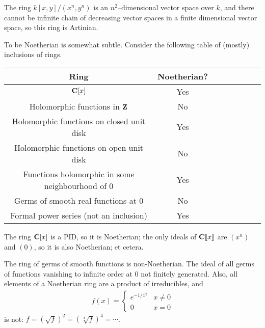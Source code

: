 \documentclass[11pt, oneside,margin=1in]{article}
\begin{document}
\begin{example}\label{}
The ring $k[x,y]/(x^n,y^n)$ is an $n^2$--dimensional vector space over $k$, and there cannot be infinite chain of decreasing vector spaces in a finite dimensional vector space, so this ring is Artinian.
\end{example}

To be Noetherian is somewhat subtle. Consider the following table of (mostly) inclusions of rings.
	\begin{center}
\begin{tabular}{cccccccc}
    	Ring & Noetherian?\\
	\midrule
	$\mathbf C[x]$ & Yes\\
	Holomorphic functions in $\mathbf Z$ & No\\
	Holomorphic functions on closed unit disk & Yes\\
	Holomorphic functions on open unit disk & No\\
	Functions holomorphic in some neighbourhood of $0$ & Yes\\
	Germs of smooth real functions at $0$ & No\\
	Formal power series (not an inclusion) & Yes
\end{tabular}
\end{center}

The ring $\mathbf C[x]$ is a PID, so it is Noetherian; the only ideals of $\mathbf C[\![x]\!]$ are $(x^n)$ and $(0)$, so it is also Noetherian; et cetera.
\iffalse The ring of holomorphic functions on $\C$ is not Noetherian: consider the ideal of functions vanishing on all but a finite number of naturals. The ring of functions holomorphic on the closed disk is a PID: any function has a finite number of roots on the closed disk, and all ideals are principal generated by polynomials. The ring of functions holomorphic on the open unit disk is not Noetherian by the same argument above: determine a sequence of numbers on the open unit disk with no limit point in the disk. 
\fi
The ring of germs of smooth functions is non-Noetherian. The ideal of all germs of functions vanishing to infinite order at $0$ not finitely generated. Also, all elements of a Noetherian ring are a product of irreducibles, and
\begin{align*} f(x) =
	\begin{cases}
		e^{-1/x^2} & x\ne 0\\
		0 & x=0
	\end{cases}
\end{align*}
is not: $f = \left( \sqrt{f} \right)^2  = \left( \sqrt[4]{f} \right)^4  = \cdots  $.
\end{document}
